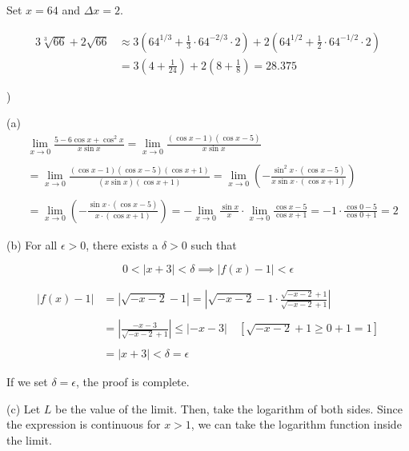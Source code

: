 \documentclass{article}
\begin{document}
\hfill

\noindent Set $x = 64$ and $\Delta x = 2$.

\begin{align*}3\sqrt[3]{66}+2\sqrt{66}&\approx3\left(64^{1/3}+\frac13\cdot64^{-2/3}\cdot2\right)+2\left(64^{1/2}+\frac{1}2\cdot64^{-1/2}\cdot2\right)\\&=3\left(4+\frac1{24}\right)+2\left(8+\frac18\right)=\boxed{28.375}\end{align*}

\newpage

)

\hfill

\noindent (a) \begin{align*}
&\lim_{x\to0}\frac{5-6\cos x + \cos^2x}{x\sin x}=\lim_{x\to0}\frac{(\cos x -1)(\cos x-5)}{x\sin x} \\\\&=\lim_{x\to0}\frac{(\cos x -1)(\cos x-5)(\cos x +1)}{(x\sin x)(\cos x +1)}
=\lim_{x\to0}\left(-\frac{\sin^2x\cdot(\cos x -5)}{x\sin x \cdot(\cos x +1)}\right)\\\\&=\lim_{x\to0}\left(-\frac{\sin x\cdot(\cos x -5)}{x \cdot(\cos x +1)}\right)=-\lim_{x\to0}\frac{\sin{x}} x\cdot \lim_{x\to0}\frac{\cos x -5}{\cos x +1}=-1\cdot\frac{\cos0 -5}{\cos0+1} = \boxed{2}
\end{align*}

\hfill

\noindent (b) For all $\epsilon > 0$, there exists a $\delta > 0$ such that

\[0<\left|x+3\right| < \delta\implies\left|f(x) - 1\right| < \epsilon\]

\begin{align*}
\left|f(x) - 1\right|&=\left|\sqrt{-x-2}-1\right| = \left|\sqrt{-x-2}-1\cdot\frac{\sqrt{-x-2}+1}{\sqrt{-x-2}+1}\right|\\\\&=\left|\frac{-x-3}{\sqrt{-x-2}+1}\right|\leq \left|-x-3\right|\quad\left[\sqrt{-x-2} + 1\geq0+1=1\right]\\\\&=\left|x+3\right|<\delta=\epsilon
\end{align*}

\hfill

\noindent If we set $\delta=\epsilon$, the proof is complete.

\hfill

\noindent (c) Let $L$ be the value of the limit. Then, take the logarithm of both sides. Since the expression is continuous for $x>1$, we can take the logarithm function inside the limit.
\end{document}
